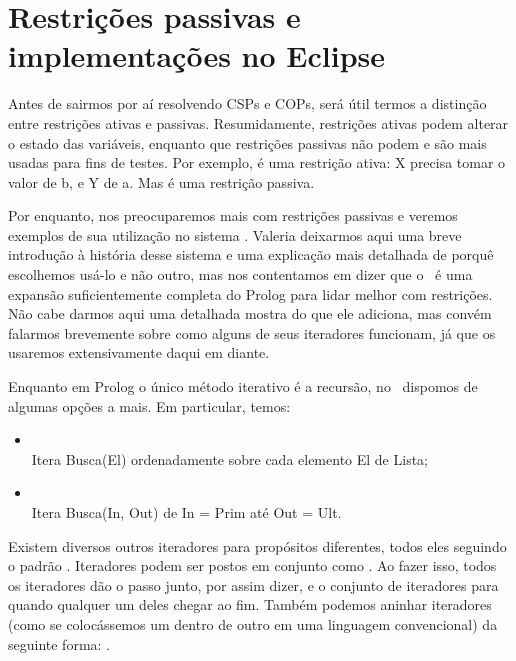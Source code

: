 \documentclass{article}
\begin{document}
\section{Restrições passivas e implementações no Eclipse}

Antes de sairmos por aí resolvendo CSPs e COPs, será útil termos a distinção entre restrições ativas e passivas. Resumidamente, restrições ativas podem alterar o estado das variáveis, enquanto que restrições passivas não podem e são mais usadas para fins de testes. Por exemplo,  é uma restrição ativa: X precisa tomar o valor de b, e Y de a. Mas  é uma restrição passiva.

Por enquanto, nos preocuparemos mais com restrições passivas e veremos exemplos de sua utilização no sistema \eclipse. Valeria deixarmos aqui uma breve introdução à história desse sistema e uma explicação mais detalhada de porquê escolhemos usá-lo e não outro, mas nos contentamos em dizer que o \eclipse\ é uma expansão suficientemente completa do Prolog para lidar melhor com restrições. Não cabe darmos aqui uma detalhada mostra do que ele adiciona, mas convém falarmos brevemente
sobre como alguns de seus iteradores funcionam, já que os usaremos extensivamente daqui em diante.

Enquanto em Prolog o único método iterativo é a recursão, no \eclipse\ dispomos de algumas opções a mais. Em particular, temos:

\begin{itemize}
  \item {}
    \\ Itera Busca(El) ordenadamente sobre cada elemento El de Lista;
  \item {}
    \\ Itera Busca(In, Out) de In = Prim até Out = Ult.
\end{itemize}

Existem diversos outros iteradores para propósitos diferentes, todos eles seguindo o padrão  . Iteradores podem ser postos em conjunto como . Ao fazer isso, todos os iteradores dão o passo junto, por assim dizer, e o conjunto de iteradores para quando qualquer um deles chegar ao fim. Também podemos aninhar iteradores (como se colocássemos um  dentro de outro em uma linguagem
convencional) da seguinte forma: .
\end{document}
